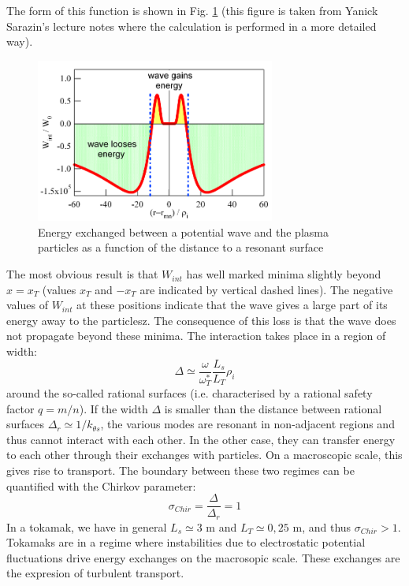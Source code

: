 The form of this function is shown in Fig. \ref{fig:Wint_résonance} (this figure is taken from Yanick Sarazin's lecture notes where the calculation is performed in a more detailed way).
\begin{figure}[htbp]
	\centering
		\includegraphics[width=0.70\textwidth]{Fig_Wint_resonance.png}
	\caption{Energy exchanged between a potential wave and the plasma particles as a function of the distance to a resonant surface}
	
	\label{fig:Wint_résonance}
\end{figure}
The most obvious result is that $W_{int}$ has well marked minima slightly beyond $x = x_T$ (values $x_T$ and $-x_T$ are indicated by vertical dashed lines). The negative values of $W_{int}$ at these positions indicate that the wave gives a large part of its energy away to the particlesz. The consequence of this loss is that the wave does not propagate beyond these minima. The interaction takes place in a region of width:
\[
		\Delta \simeq \frac{\omega}{\omega_T^*}\frac{L_s}{L_T}\rho_i
\]
around the so-called rational surfaces (i.e. characterised by a rational safety factor $q = m/n$). If the width $\Delta$ is smaller than the distance between rational surfaces $\Delta_r \simeq 1/k_{\theta s}$, the various modes are resonant in non-adjacent regions and thus cannot interact with each other. In the other case, they can transfer energy to each other through their exchanges with particles. On a macroscopic scale, this gives rise to transport. The boundary between these two regimes can be quantified with the Chirkov parameter:
\[
		\sigma_{Chir} = \frac{\Delta}{\Delta_r} = 1
\]
In a tokamak, we have in general $L_s \simeq 3$ m and $L_T \simeq 0,25$ m, and thus $\sigma_{Chir} > 1$. Tokamaks are in a regime where instabilities due to electrostatic potential fluctuations drive energy exchanges on the macrosopic scale. These exchanges are the expresion of turbulent transport.



